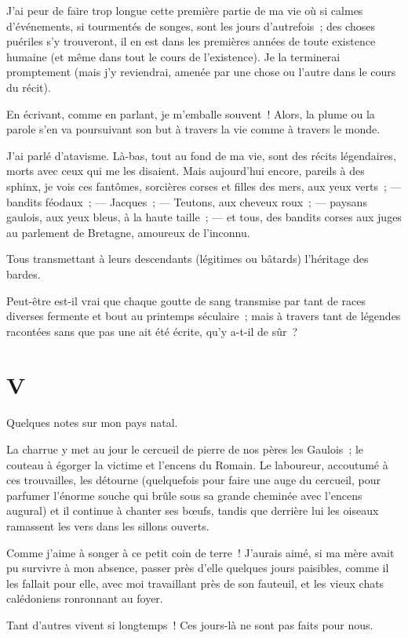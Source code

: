\documentclass[french,twoside]{book} %
\newcommand\chapteropen{} %
\newcommand\chaptercont{} %
\newcommand\chapterclose{} %
\begin{document}
\noindent J’ai peur de faire trop longue cette première partie de ma vie où si calmes d’événements, si tourmentés de songes, sont les jours d’autrefois ; des choses puériles s’y trouveront, il en est dans les premières années de toute existence humaine (et même dans tout le cours de l’existence). Je la terminerai promptement (mais j’y reviendrai, amenée par une chose ou l’autre dans le cours du récit).\par
 En écrivant, comme en parlant, je m’emballe souvent ! Alors, la plume ou la parole s’en va poursuivant son but à travers la vie comme à travers le monde.\par
J’ai parlé d’atavisme. Là-bas, tout au fond de ma vie, sont des récits légendaires, morts avec ceux qui me les disaient. Mais aujourd’hui encore, pareils à des sphinx, je vois ces fantômes, sorcières corses et filles des mers, aux yeux verts ; — bandits féodaux ; — Jacques ; — Teutons, aux cheveux roux ; — paysans gaulois, aux yeux bleus, à la haute taille ; — et tous, des bandits corses aux juges au parlement de Bretagne, amoureux de l’inconnu.\par
Tous transmettant à leurs descendants (légitimes ou bâtards) l’héritage des bardes.\par
Peut-être est-il vrai que chaque goutte de sang transmise par tant de races diverses fermente et bout au printemps séculaire ; mais à travers tant de légendes racontées sans que pas une ait été écrite, qu’y a-t-il de sûr ?
\chapterclose


\chapteropen
 \chapter[{V}]{V}
\label{p1.5}

\chaptercont
\noindent Quelques notes sur mon pays natal.\par
La charrue y met au jour le cercueil de pierre de nos pères les Gaulois ; le couteau à égorger la victime et l’encens du Romain. Le laboureur, accoutumé à ces trouvailles, les détourne (quelquefois pour faire une auge du cercueil, pour parfumer l’énorme souche qui brûle sous sa grande cheminée avec l’encens augural) et il continue à chanter ses bœufs, tandis que derrière lui les oiseaux ramassent les vers dans les sillons ouverts.\par
Comme j’aime à songer à ce petit coin de terre ! J’aurais aimé, si ma mère avait pu survivre à mon absence, passer près d’elle quelques jours paisibles, comme il les fallait pour elle, avec moi travaillant près de son fauteuil, et les vieux chats calédoniens ronronnant au foyer.\par
Tant d’autres vivent si longtemps ! Ces jours-là ne sont pas faits pour nous.\par
 
\end{document}
